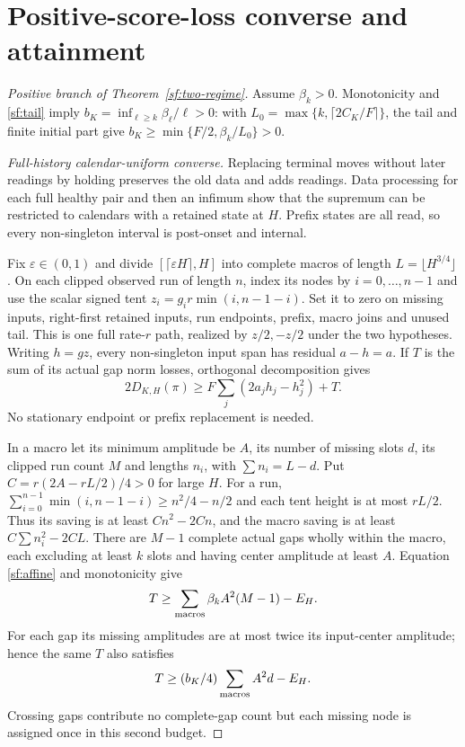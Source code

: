 \documentclass[journal]{IEEEtran}
\begin{document}
\section{Positive-score-loss converse and attainment}\label{sf:positive-proof}
\begin{proof}[Positive branch of Theorem~\ref{sf:two-regime}]\leavevmode
Assume $\beta_k>0$. Monotonicity and \eqref{sf:tail} imply
$b_K=\inf_{\ell\ge k}\beta_\ell/\ell>0$: with
$L_0=\max\{k,\lceil2C_K/F\rceil\}$, the tail and finite initial part give
$b_K\ge\min\{F/2,\beta_k/L_0\}>0$.
\par\smallskip\noindent\textit{Full-history calendar-uniform converse.}\enspace 
Replacing terminal moves without later readings by holding preserves the old
data and adds readings. Data processing for each full healthy pair and then
an infimum show that the supremum can be restricted to calendars with a
retained state at $H$. Prefix states are all read, so every non-singleton interval is
post-onset and internal.

Fix $\varepsilon\in(0,1)$ and divide $[\lceil\varepsilon H\rceil,H]$
into complete macros
of length $L=\lfloor H^{3/4}\rfloor$.
On each clipped observed run of length $n$, index its nodes by
$i=0,\ldots,n-1$ and use the scalar signed tent
$z_i=g_i r\min(i,n-1-i)$.
Set it to zero on missing inputs, right-first retained inputs, run endpoints,
prefix, macro joins and unused tail. This is one full rate-$r$ path, realized
by $z/2,-z/2$ under the two hypotheses.
Writing $h=gz$, every non-singleton input span has residual $a-h=a$.
If $T$ is the sum of its actual gap norm losses, orthogonal decomposition gives
\begin{equation}\label{sf:converse}
2D_{K,H}(\pi)\ge F\sum_j(2a_jh_j-h_j^2)+T .
\end{equation}
No stationary endpoint or prefix replacement is needed.

In a macro let its minimum amplitude be $A$, its number of missing slots $d$,
its clipped run count $M$ and lengths $n_i$, with $\sum n_i=L-d$.
Put $C=r(2A-rL/2)/4>0$ for large $H$.
For a run, $\sum_{i=0}^{n-1}\min(i,n-1-i)\ge n^2/4-n/2$
and each tent height is at most $rL/2$. Thus its saving is at least
$Cn^2-2Cn$, and the macro saving is at least $C\sum n_i^2-2CL$.
There are $M-1$ complete actual gaps wholly within the macro, each excluding at least
$k$ slots and having center amplitude at least $A$.
Equation \eqref{sf:affine} and monotonicity give
\[
T\ge\sum_{\rm macros}\beta_kA^2(M-1)-E_H.
\]
For each gap its missing amplitudes are at most twice its input-center
amplitude; hence the same $T$ also satisfies
\[
T\ge(b_K/4)\sum_{\rm macros}A^2d-E_H .
\]
Crossing gaps contribute no complete-gap count but each missing node is
assigned once in this second budget.


\end{proof}
\end{document}
